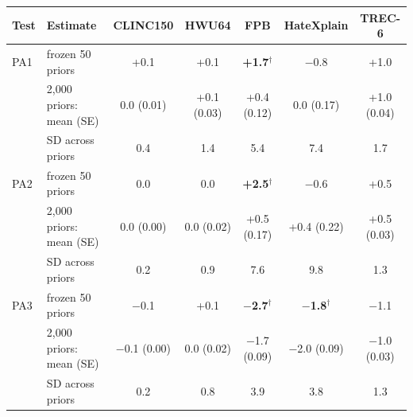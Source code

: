 \begin{tabular}{llccccc}
\toprule
Test & Estimate & CLINC150 & HWU64 & FPB & HateXplain & TREC-6 \\
\midrule
PA1 & frozen 50 priors & +0.1 & +0.1 & \textbf{+1.7}$^\dagger$ & $-$0.8 & +1.0 \\
 & 2{,}000 priors: mean (SE) & 0.0 (0.01) & +0.1 (0.03) & +0.4 (0.12) & 0.0 (0.17) & +1.0 (0.04) \\
 & SD across priors & 0.4 & 1.4 & 5.4 & 7.4 & 1.7 \\
\midrule
PA2 & frozen 50 priors & 0.0 & 0.0 & \textbf{+2.5}$^\dagger$ & $-$0.6 & +0.5 \\
 & 2{,}000 priors: mean (SE) & 0.0 (0.00) & 0.0 (0.02) & +0.5 (0.17) & +0.4 (0.22) & +0.5 (0.03) \\
 & SD across priors & 0.2 & 0.9 & 7.6 & 9.8 & 1.3 \\
\midrule
PA3 & frozen 50 priors & $-$0.1 & +0.1 & \textbf{$-$2.7}$^\dagger$ & \textbf{$-$1.8}$^\dagger$ & $-$1.1 \\
 & 2{,}000 priors: mean (SE) & $-$0.1 (0.00) & 0.0 (0.02) & $-$1.7 (0.09) & $-$2.0 (0.09) & $-$1.0 (0.03) \\
 & SD across priors & 0.2 & 0.8 & 3.9 & 3.8 & 1.3 \\
\bottomrule
\end{tabular}
